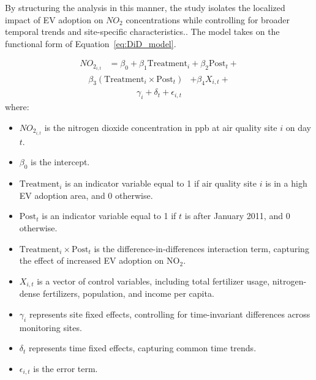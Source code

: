 \documentclass[12pt]{article}
\newcommand\tab[1][.50cm]{\hspace*{#1}}
\begin{document}
\begin{multicols}{2}
		\tab By structuring the analysis in this manner, the study isolates the localized impact of EV adoption on $NO_2$ concentrations while controlling for broader temporal trends and site-specific characteristics.. The model takes on the functional form of Equation~\ref{eq:DiD_model}.
		
		\begin{align}
			NO_{2_{i,t}} &= \beta_0 + \beta_1 \text{Treatment}_{i} + \beta_2 \text{Post}_{t} + \nonumber \end{align} \begin{align}
			\beta_3 (\text{Treatment}_{i} \times \text{Post}_{t})
			& + \beta_4 X_{i,t} + \nonumber \end{align} \begin{align}
			\gamma_i + \delta_t + \epsilon_{i,t} \label{eq:DiD_model}
		\end{align}
		where:
		\begin{itemize}
			\item \( NO_{2_{i,t}} \) is the nitrogen dioxide concentration in ppb at air quality site \( i \) on day \( t \).
			\item \( \beta_0 \) is the intercept.
			\item \( \text{Treatment}_{i} \) is an indicator variable equal to 1 if air quality site \( i \) is in a high EV adoption area, and 0 otherwise.
			\item \( \text{Post}_{t} \) is an indicator variable equal to 1 if \( t \) is after January 2011, and 0 otherwise.
			\item \( \text{Treatment}_{i} \times \text{Post}_{t} \) is the difference-in-differences interaction term, capturing the effect of increased EV adoption on \(\text{NO}_2\).
			\item \( X_{i,t} \) is a vector of control variables, including total fertilizer usage, nitrogen-dense fertilizers, population, and income per capita.
			\item \( \gamma_i \) represents site fixed effects, controlling for time-invariant differences across monitoring sites.
			\item \( \delta_t \) represents time fixed effects, capturing common time trends.
			\item \( \epsilon_{i,t} \) is the error term.
		\end{itemize} 
		

\end{multicols}
\end{document}
